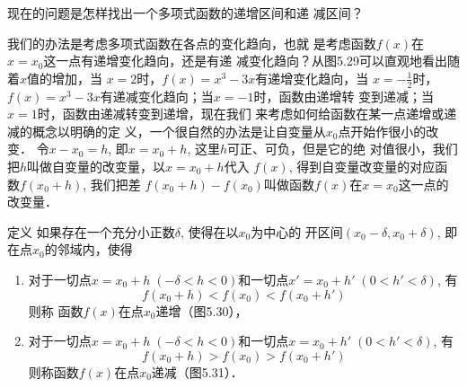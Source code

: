 现在的问题是怎样找出一个多项式函数的递增区间和递
减区间？

我们的办法是考虑多项式函数在各点的变化趋向，也就
是考虑函数$f(x)$在$x=x_0$这一点有递增变化趋向，还是有递
减变化趋向？从图5.29可以直观地看出随着$x$值的增加，当
$x=2$时，$f(x)=x^3-3x$有递增变化趋向，当
$x=-\frac{1}{2}$时，
$f(x)=x^3-3x$有递减变化趋向；当$x=-1$时，函数由递增转
变到递减；当$x=1$时，函数由递减转变到递增，现在我们
来考虑如何给函数在某一点递增或递减的概念以明确的定
义，一个很自然的办法是让自变量从$x_0$点开始作很小的改变．
令$x-x_0=h$, 即$x=x_0+h$, 这里$h$可正、可负，但是它的绝
对值很小，我们把$h$叫做自变量的改变量，以$x=x_0+h$代入
$f(x)$, 得到自变量改变量的对应函数$f(x_0+h)$, 我们把差
$f(x_0+h)-f(x_0)$叫做函数$f(x)$在$x=x_0$这一点的改变量．


\begin{blk}{定义}
    如果存在一个充分小正数$\delta $, 使得在以$x_0$为中心的
开区间$(x_0-\delta,x_0+\delta)$, 即在点$x_0$的邻域内，使得
\begin{enumerate}
    \item 对于一切点$x=x_0+h\; (-\delta<h<0)$和一切点$x'=
x_0+h'\; (0<h'<\delta)$, 有$$f(x_0+h)<f(x_0)<f(x_0+h')$$ 则称
函数$f(x)$在点$x_0$递增（图5.30），
\item 对于一切点$x=x_0+h\; (-\delta<h<0)$和一切点$x=x_0+
h'\; (0<h'<\delta)$, 有
$$f(x_0+h)>f(x_0)>f(x_0+h')$$
则称函数$f(x)$在点$x_0$递减（图5.31）．
\end{enumerate}
\end{blk}

